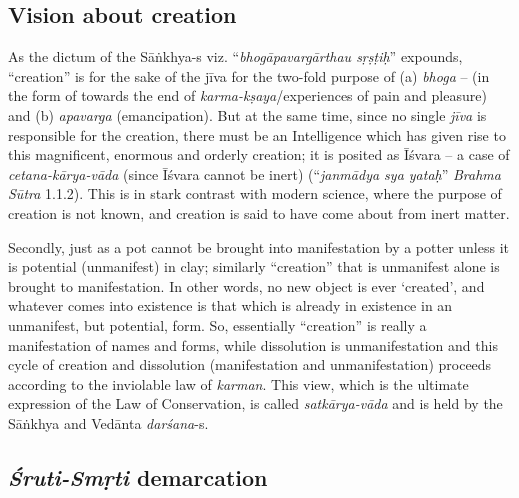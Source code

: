 \subsection{Vision about creation}\label{art12-sec2.3}

As the dictum of the Sāṅkhya-s viz. ``{\sl bhogāpavargārthau sṛṣṭiḥ}'' expounds, ``creation'' is for the sake of the jīva for the two-fold purpose of (a) {\sl bhoga} -- (in the form of towards the end of {\sl karma-kṣaya}/experiences of pain and pleasure) and (b) {\sl apavarga} (emancipation). But at the same time, since no single {\sl jīva} is responsible for the creation, there must be an Intelligence which has given rise to this magniﬁcent, enormous and orderly creation; it is posited as Īśvara -- a case of {\sl cetana-kārya-vāda} (since Īśvara cannot be inert) (``{\sl janmādya sya yataḥ}'' {\sl Brahma Sūtra} 1.1.2). This is in stark contrast with modern science, where the purpose of creation is not known, and creation is said to have come about from inert matter. 

Secondly, just as a pot cannot be brought into manifestation by a potter unless it is potential (unmanifest) in clay; similarly ``creation'' that is unmanifest alone is brought to manifestation. In other words, no new object is ever `created', and whatever comes into existence is that which is already in existence in an unmanifest, but potential, form. So, essentially ``creation'' is really a manifestation of names and forms, while dissolution is unmanifestation and this cycle of creation and dissolution (manifestation and unmanifestation) proceeds according to the inviolable law of {\sl karman}. This view, which is the ultimate expression of the Law of Conservation, is called {\sl satkārya-vāda} and is held by the Sāṅkhya and Vedānta {\sl darśana}-s.\\[-20pt]

\subsection{{{\sl\bfseries Śruti-Smṛti}\relax} demarcation}\label{art12-sec2.4}


